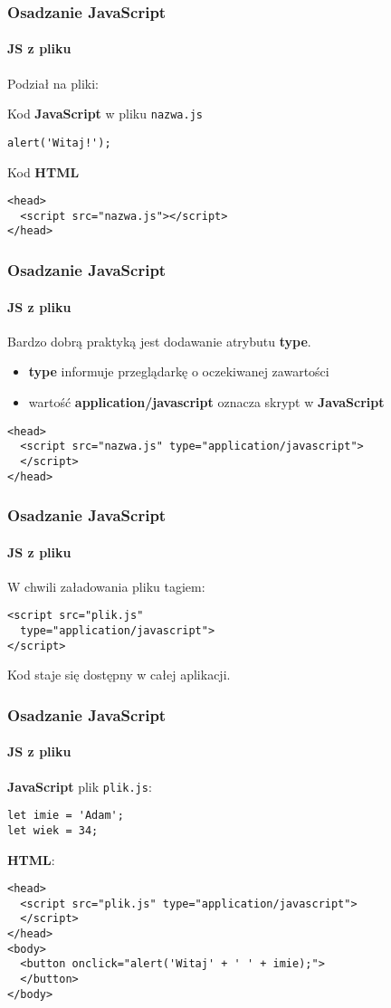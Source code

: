 \begin{frame}[fragile]
  \frametitle{Osadzanie JavaScript}
  \framesubtitle{JS z pliku}

  Podział na pliki:

  Kod \textbf{JavaScript} w pliku \verb|nazwa.js|
  \begin{verbatim}
alert('Witaj!');
  \end{verbatim}

  Kod \textbf{HTML}
  \begin{verbatim}
<head>
  <script src="nazwa.js"></script>
</head>
  \end{verbatim}

\end{frame}


\begin{frame}[fragile]
  \frametitle{Osadzanie JavaScript}
  \framesubtitle{JS z pliku}

  Bardzo dobrą praktyką jest dodawanie atrybutu \textbf{type}.

  \begin{itemize}
    \item \textbf{type} informuje przeglądarkę o oczekiwanej zawartości
    \item wartość \textbf{application/javascript} oznacza skrypt w \textbf{JavaScript}
  \end{itemize}

  \begin{verbatim}
<head>
  <script src="nazwa.js" type="application/javascript">
  </script>
</head>
  \end{verbatim}

\end{frame}


\begin{frame}[fragile]
  \frametitle{Osadzanie JavaScript}
  \framesubtitle{JS z pliku}

  W chwili załadowania pliku tagiem:

  \begin{verbatim}
<script src="plik.js"
  type="application/javascript">
</script>
  \end{verbatim}

  Kod staje się dostępny w całej aplikacji.

\end{frame}


\begin{frame}[fragile]
  \frametitle{Osadzanie JavaScript}
  \framesubtitle{JS z pliku}

  \textbf{JavaScript} plik \verb|plik.js|:

  \begin{verbatim}
let imie = 'Adam';
let wiek = 34;
  \end{verbatim}

  \textbf{HTML}:

  \begin{verbatim}
<head>
  <script src="plik.js" type="application/javascript">
  </script>
</head>
<body>
  <button onclick="alert('Witaj' + ' ' + imie);">
  </button>
</body>
  \end{verbatim}

\end{frame}
